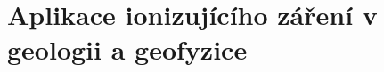 \section[Aplikace ionizujícího záření v geologii a geofyzice]{Aplikace ionizujícího záření v geologii a geofyzice}

